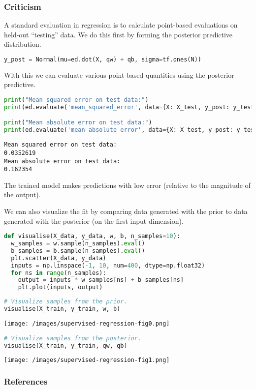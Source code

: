 \subsubsection{Criticism}

A standard evaluation in regression is to calculate point-based evaluations on
held-out ``testing'' data. We do this first by forming the posterior predictive
distribution.
\begin{lstlisting}[language=Python]
y_post = Normal(mu=ed.dot(X, qw) + qb, sigma=tf.ones(N))
\end{lstlisting}

With this we can evaluate various point-based quantities using the posterior
predictive.
\begin{lstlisting}[language=Python]
print("Mean squared error on test data:")
print(ed.evaluate('mean_squared_error', data={X: X_test, y_post: y_test}))

print("Mean absolute error on test data:")
print(ed.evaluate('mean_absolute_error', data={X: X_test, y_post: y_test}))
\end{lstlisting}

\begin{lstlisting}
Mean squared error on test data:
0.0352619
Mean absolute error on test data:
0.162354
\end{lstlisting}

The trained model makes predictions with low error
(relative to the magnitude of the output).

We can also visualize the fit by comparing data generated with the
prior to data generated with the posterior (on the first input
dimension).

\begin{lstlisting}[language=Python]
def visualise(X_data, y_data, w, b, n_samples=10):
  w_samples = w.sample(n_samples).eval()
  b_samples = b.sample(n_samples).eval()
  plt.scatter(X_data, y_data)
  inputs = np.linspace(-1, 10, num=400, dtype=np.float32)
  for ns in range(n_samples):
    output = inputs * w_samples[ns] + b_samples[ns]
    plt.plot(inputs, output)
\end{lstlisting}

\begin{lstlisting}[language=Python]
# Visualize samples from the prior.
visualise(X_train, y_train, w, b)
\end{lstlisting}

\texttt{[image: /images/supervised-regression-fig0.png]}

\begin{lstlisting}[language=Python]
# Visualize samples from the posterior.
visualise(X_train, y_train, qw, qb)
\end{lstlisting}

\texttt{[image: /images/supervised-regression-fig1.png]}

\subsubsection{References}\label{references}
